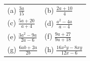 \begin{enumerate}[noitemsep, label=\textbf{\arabic*}. ]
{\begin{center}
\begin{xtabular*}{\mytablewidth}[t]{|p{10\mystarwidth}|p{10\mystarwidth}|}
        (a) $\frac{3a}{15}$\hspace{1ex} &
        (b) $\frac{2a+10}{4}$\hspace{1ex}%
     \tabularnewline{}
        (c) $\frac{5a+20}{a+4}$\hspace{1ex} &
        (d) $\frac{{a}^{2}-4a}{a-4}$\hspace{1ex}%
     \tabularnewline{}
        (e) $\frac{3{a}^{2}-9a}{2a-6}$\hspace{1ex} &
        (f) $\frac{9a+27}{9a+18}$\hspace{1ex}%
     \tabularnewline{}
        (g) $\frac{6ab+2a}{2b}$\hspace{1ex} &
        (h) $\frac{16{x}^{2}y-8xy}{12x-6}$\hspace{1ex}%

\end{xtabular*}
\end{center}}
\end{enumerate}
